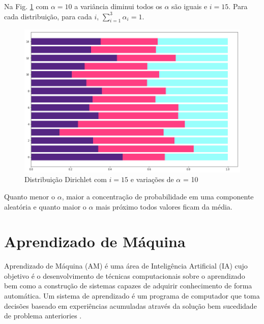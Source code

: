 Na Fig. \ref{dist-dir:alpha10} com $\alpha=10$ a variância diminui todos os $\alpha$ são iguais e $i=15$. Para cada distribuição, para cada $i$, $\sum_{i=1}^{3} \alpha_i = 1$.


\begin{figure}[!h]
	\centering
	\includegraphics[keepaspectratio=true,scale=0.4]{figuras/resultados-dist-dir-10-3.png}
	\caption{Distribuição Dirichlet com $i=15$ e variações de $\alpha$ = 10 }
	\label{dist-dir:alpha10}
\end{figure}

Quanto menor o $\alpha$, maior a concentração de probabilidade em uma componente aleatória e quanto maior o $\alpha$ mais próximo todos valores ficam da média.


\section{Aprendizado de Máquina}

Aprendizado de Máquina (AM) é uma área de Inteligência Artificial (IA) cujo objetivo é o desenvolvimento de técnicas computacionais sobre o aprendizado bem como a construção de sistemas capazes de adquirir conhecimento de forma automática. Um sistema de aprendizado é um programa de computador que toma decisões baseado em experiências acumuladas através da solução bem sucedidade de problema anteriories \cite{monard2003}. 


